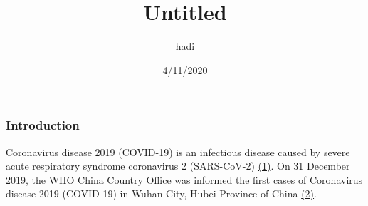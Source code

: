 \documentclass[
]{article}
\title{Untitled}
\author{hadi}
\date{4/11/2020}
\begin{document}
\maketitle

\hypertarget{introduction}{%
\subsubsection{Introduction}\label{introduction}}

Coronavirus disease 2019 (COVID-19) is an infectious disease caused by
severe acute respiratory syndrome coronavirus 2 (SARS-CoV-2)
\href{https://www.who.int/emergencies/diseases/novel-coronavirus-2019/technical-guidance/naming-the-coronavirus-disease-\%28covid-2019\%29-and-the-virus-that-causes-it}{(1)}.
On 31 December 2019, the WHO China Country Office was informed the first
cases of Coronavirus disease 2019 (COVID-19) in Wuhan City, Hubei
Province of China
\href{https://www.who.int/docs/default-source/coronaviruse/situation-reports/20200121-sitrep-1-2019-ncov.pdf?sfvrsn=20a99c10_4}{(2)}.
\end{document}
